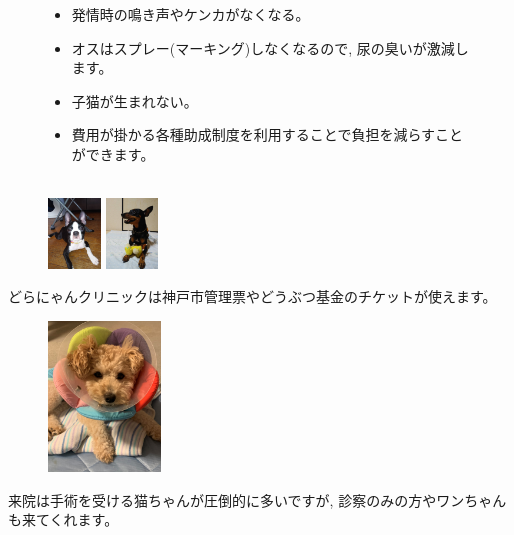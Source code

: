 \documentclass{jsarticle}
\begin{document}
	\begin{figure}[htbp]
		\Large
		\centering
		\begin{minipage}{0.4\columnwidth}
			\begin{itemize}
				\item 発情時の鳴き声やケンカがなくなる。
				\item オスはスプレー(マーキング)しなくなるので, 尿の臭いが激減します。
				\item 子猫が生まれない。
			\end{itemize}
		\end{minipage}
		\begin{minipage}{0.4\columnwidth}
			\begin{itemize}
				\item 費用が掛かる各種助成制度を利用することで負担を減らすことができます。\\\\
			\end{itemize}
		\end{minipage}
	\end{figure}

	\begin{figure}
		\includegraphics[width=1.4cm]{6.jpg}
		\includegraphics[width=1.4cm]{7.jpg}
	\end{figure}
	どらにゃんクリニックは神戸市管理票やどうぶつ基金のチケットが使えます。

	\vspace{30pt}
	\begin{figure}
		\vspace*{-\intextsep}
		\includegraphics[width=3cm]{5.jpg}
	\end{figure}
	来院は手術を受ける猫ちゃんが圧倒的に多いですが, 診察のみの方やワンちゃんも来てくれます。
\end{document}
